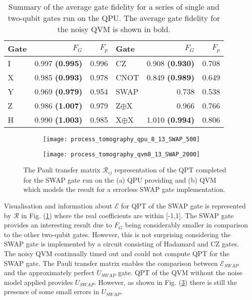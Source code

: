 \begin{table}[t]
  \begin{center}
    \caption{Summary of the average gate fidelity for a series of single and two-qubit gates run on the QPU. The average gate fidelity for the noisy QVM is shown in bold.}
    \label{tab:table1}
    \begin{tabular}{l|r|r|l|r|r} %
      Gate & $F_{G}$ & $F_{p}$ & Gate & $F_{G}$ & $F_{p}$\\
       \hline
      I & 0.997 \textbf{(0.995)} & 0.996 & CZ & 0.908 \textbf{(0.930)} & 0.708\\
      X & 0.985 \textbf{(0.993)} & 0.978 & CNOT & 0.849 \textbf{(0.989)} & 0.649 \\
      Y & 0.969 \textbf{(0.979)} & 0.954 & SWAP & 0.738 & 0.538 \\
      Z & 0.986 \textbf{(1.007)} & 0.979 & Z$\oplus$X & 0.966 & 0.766 \\
      H & 0.990 \textbf{(1.003)} & 0.985 & X$\oplus$X & 1.010 \textbf{(0.994)} & 0.806 \\                 
    \end{tabular}
  \end{center}
\end{table}

\begin{figure}[b]
\centering
\begin{subfigure}[b]{0.5\textwidth}
   \texttt{[image: process\_tomography\_qpu\_8\_13\_SWAP\_500]} \caption{\label{fig:process_tomography_qpu_8_13_SWAP_500}}
\end{subfigure}
\begin{subfigure}[b]{0.5\textwidth}
   \texttt{[image: process\_tomography\_qvm8\_13\_SWAP\_2000]}
\caption{\label{fig:process_tomography_qvm8_13_SWAP_2000}}
\end{subfigure}
\caption[]{The Pauli transfer matrix $\mathcal{R}_{ij}$ representation of the QPT completed for the SWAP gate run on the (a) QPU providing and (b) QVM which models the result for a errorless SWAP gate implementation.}
\end{figure}

Visualisation and information about $\mathcal{E}$ for QPT of the SWAP gate is represented by $\mathcal{R}$ in Fig. (\ref{fig:process_tomography_qpu_8_13_SWAP_500}) where the real coefficients are within [-1,1]. The SWAP gate provides an interesting result due to $F_{G}$ being considerably smaller in comparison to the other two-qubit gates. However, this is not surprising considering the SWAP gate is implemented by a circuit consisting of Hadamard and CZ gates. The noisy QVM continually timed out and could not compute QPT for the SWAP gate. The Pauli transfer matrix enables the comparison between $\mathcal{E}_{SWAP}$ and the approximately perfect $U_{SWAP}$ gate. QPT of the QVM without the noise model applied provides $U_{SWAP}$. However, as shown in Fig. (\ref{fig:process_tomography_qvm8_13_SWAP_2000}) there is still the presence of some small errors in $U_{SWAP}$.

